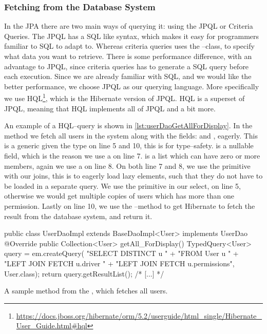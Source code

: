 \subsubsection*{Fetching from the Database System}\label{subsec:fetchfromdb}
In the \ac{JPA} there are two main ways of querying it: using the \ac{JPQL} or Criteria Queries.
The \ac{JPQL} has a \ac{SQL} like syntax, which makes it easy for programmers familiar to \ac{SQL} to adapt to.
Whereas criteria queries uses the --class, to specify what data you want to retrieve.
There is some performance difference, with an advantage to \ac{JPQL}, since criteria queries has to generate a \ac{SQL} query before each execution\cite{jboss_fetchingstrategies}.
Since we are already familiar with \ac{SQL}, and we would like the better performance, we choose \ac{JPQL} as our querying language.
More specifically we use \ac{HQL}\footnote{\url{https://docs.jboss.org/hibernate/orm/5.2/userguide/html_single/Hibernate_User_Guide.html\#hql}}, which is the Hibernate version of \ac{JPQL}.
\ac{HQL} is a superset of \ac{JPQL}, meaning that \ac{HQL} implements all of \ac{JPQL} and a bit more.

\bigskip
An example of a \ac{HQL}--query is shown in \cref{lst:userDaoGetAllForDisplay}.
In the method  we fetch all users in the system along with the fields:  and , eagerly.
This is a  generic given the type  on line 5 and 10, this is for type--safety.
 is a nullable field, which is the reason we use a  on line 7.
 is a list which can have zero or more members, again we use a  on line 8.
On both line 7 and 8, we use the  primitive with our joins,
this is to eagerly load lazy elements, such that they do not have to be loaded in a separate query.
We use the  primitive in our select, on line 5,
otherwise we would get multiple copies of users which has more than one permission.
Lastly on line 10, we use the --method to get Hibernate to fetch the result from the database system, and return it.
\begin{listing}
    \begin{java2}
public class UserDaoImpl extends BaseDaoImpl<User> implements UserDao {
    @Override
    public Collection<User> getAll_ForDisplay() {
        TypedQuery<User> query = em.createQuery(
            "SELECT DISTINCT u " +
                "FROM User u " +
                "LEFT JOIN FETCH u.driver " +
                "LEFT JOIN FETCH u.permissions",
            User.class);
        return query.getResultList();
    }
    /* [...] */
}
    \end{java2}
    \caption{A sample method from the , which fetches all users.}\label{lst:userDaoGetAllForDisplay}
\end{listing}

